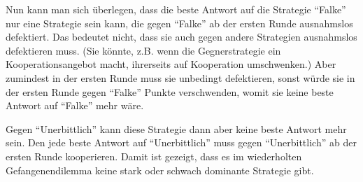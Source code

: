 Nun kann man sich überlegen, dass die beste Antwort auf die Strategie "`Falke"'
nur eine Strategie sein kann, die gegen "`Falke"' ab der ersten Runde ausnahmslos
defektiert. Das bedeutet nicht, dass sie auch gegen andere Strategien
ausnahmslos defektieren muss. (Sie könnte, z.B. wenn die Gegnerstrategie ein
Kooperationsangebot macht, ihrerseits auf Kooperation umschwenken.) Aber
zumindest in der ersten Runde muss sie unbedingt defektieren, sonst würde sie
in der ersten Runde gegen "`Falke"' Punkte verschwenden, womit sie keine beste
Antwort auf "`Falke"' mehr wäre.

Gegen "`Unerbittlich"' kann diese Strategie dann aber keine beste Antwort mehr
sein. Den jede beste Antwort auf "`Unerbittlich"' muss gegen "`Unerbittlich"' ab
der ersten Runde kooperieren. Damit ist gezeigt, dass es im wiederholten
Gefangenendilemma keine stark oder schwach dominante Strategie gibt.

